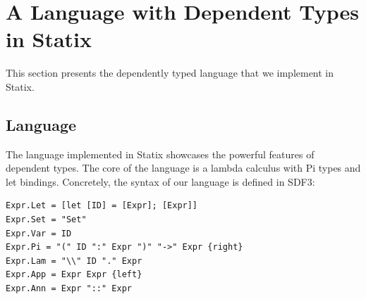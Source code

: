 \section{\label{sec:Language}A Language with Dependent Types in Statix}

This section presents the dependently typed language that we implement in
Statix.

\subsection{Language}
The language implemented in Statix showcases the powerful features of dependent types. The core of the language is a lambda calculus with Pi types and let bindings. Concretely, the syntax of our language is defined in SDF3:
\begin{lstlisting}[caption={Necessary syntax for dependent types}, language=SDF3]
Expr.Let = [let [ID] = [Expr]; [Expr]]
Expr.Set = "Set"
Expr.Var = ID
Expr.Pi = "(" ID ":" Expr ")" "->" Expr {right}
Expr.Lam = "\\" ID "." Expr
Expr.App = Expr Expr {left}  
Expr.Ann = Expr "::" Expr
\end{lstlisting}

